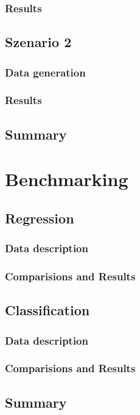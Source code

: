 \documentclass[12pt,letterpaper]{article}
\begin{document}
\subsubsection{Results}
\subsection{Szenario 2}
\subsubsection{Data generation}
\subsubsection{Results}

\subsection{Summary}
\pagebreak

\section{Benchmarking}

\subsection{Regression}
\subsubsection{Data description}
\subsubsection{Comparisions and Results}
\subsection{Classification}
\subsubsection{Data description}
\subsubsection{Comparisions and Results}

\subsection{Summary}
\end{document}
